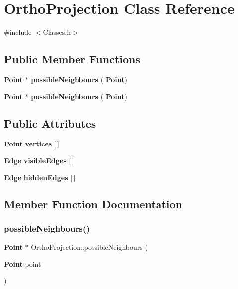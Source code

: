 \section{Ortho\+Projection Class Reference}
\label{class_ortho_projection}


{\ttfamily \#include $<$Classes.\+h$>$}

\subsection*{Public Member Functions}
\begin{DoxyCompactItemize}
\item 
\textbf{ Point} $\ast$ \textbf{ possible\+Neighbours} (\textbf{ Point})
\item 
\textbf{ Point} $\ast$ \textbf{ possible\+Neighbours} (\textbf{ Point})
\end{DoxyCompactItemize}
\subsection*{Public Attributes}
\begin{DoxyCompactItemize}
\item 
\textbf{ Point} \textbf{ vertices} [$\,$]
\item 
\textbf{ Edge} \textbf{ visible\+Edges} [$\,$]
\item 
\textbf{ Edge} \textbf{ hidden\+Edges} [$\,$]
\end{DoxyCompactItemize}


\subsection{Member Function Documentation}
\mbox{\label{class_ortho_projection_aa0634b80a904634451f03a11db28c33d}} 
\subsubsection{possible\+Neighbours()\hspace{0.1cm}{\footnotesize\ttfamily [1/2]}}
{\footnotesize\ttfamily \textbf{ Point} $\ast$ Ortho\+Projection\+::possible\+Neighbours (\begin{DoxyParamCaption}\item[{\textbf{ Point}}]{point }\end{DoxyParamCaption})}

